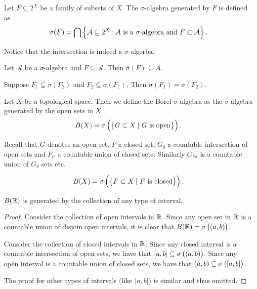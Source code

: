 \documentclass[11pt,a4paper]{article}
\newcommand{\A}{\mathcal A}
\begin{document}
\begin{example}
  Let $F \subseteq 2^X$ be a family of subsets of $X$.
  The $\sigma$-algebra generated by $F$ is defined as
  \[
    \sigma(F) = \bigcap \set{\mathcal A \subseteq 2^X \colon 
    \A \text{ is a $\sigma$-algebra} \stand F \subset \A}.
  \]
\end{example}
\begin{remark}
  Notice that the intersection is indeed a $\sigma$-algerba.
\end{remark}
\begin{remark}
  Let $\A$ be a $\sigma$-algebra and $F \subseteq \A$.
  Then $\sigma(F) \subseteq A$.
\end{remark}
\begin{corollary}
  Suppose $F_1 \subseteq \sigma(F_2)$ and $F_2 \subseteq \sigma(F_1)$.
  Then $\sigma(F_1) = \sigma(F_2)$.
\end{corollary}

\begin{definition}
  Let $X$ be a topological space.
  Then we define the Borel $\sigma$-algebra as the $\sigma$-algebra generated
  by the open sets in $X$.
  \[
    B(X) = \sigma\del{\set{G \subset X \mid G \text{ is open}}}.
  \]
\end{definition}
\begin{remark}
  Recall that $G$ denotes an open set, $F$ a closed set, $G_{\delta}$
  a countable intersection of open sets and $F_{\sigma}$ a countable
  union of closed sets.
  Similarly $G_{\delta \sigma}$ is a countable union of $G_{\delta}$ sets
  etc.
\end{remark}
\begin{remark}
  \[
    B(X) = \sigma\del{\set{F \subset X \mid F \text{ is closed}}}.
  \]
\end{remark}

\begin{proposition}
  $B(\mathbb{R})$ is generated by the collection of any type of interval.
\end{proposition}
\begin{proof}
  Consider the collection of open intervals in $\mathbb{R}$.
  Since any open set in $\mathbb{R}$ is a countable union of disjoin open intervals,
  it is clear that $B(\R) = \sigma\del{(a,b)}$.

  Consider the collection of closed intervals in $\mathbb{R}$.
  Since any closed interval is a countable intersection of open sets,
  we have that $[a,b] \subseteq \sigma\del{(a,b)}$.
  Since any open interval is a countable union of closed sets,
  we have that $(a,b) \subseteq \sigma\del{[a,b]}$.
  
  The proof for other types of intervals (like $(a,b]$) is similar and thus
  omitted.
\end{proof}
\end{document}

